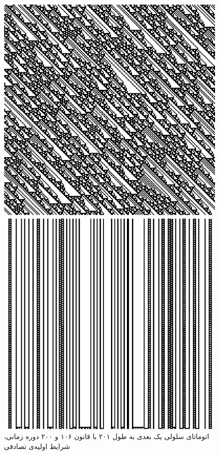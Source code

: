 \documentclass[11pt, a4paper]{article}
\begin{document}
\begin{figure}[!tbp]
  \begin{minipage}[b]{0.3\textwidth}
    \includegraphics[width=\textwidth]{q3-106-rand}
    \caption{اتوماتای سلولی یک بعدی به طول ۲۰۱ با قانون ۱۰۶ و ۲۰۰ دوره زمانی، شرایط اولیه‌ی تصادفی}
    \label{fig:q3-106-rand}
  \end{minipage}
  \hfill
  \begin{minipage}[b]{0.3\textwidth}
    \includegraphics[width=\textwidth]{q3-108-rand}

\end{minipage}
\end{figure}
\end{document}
